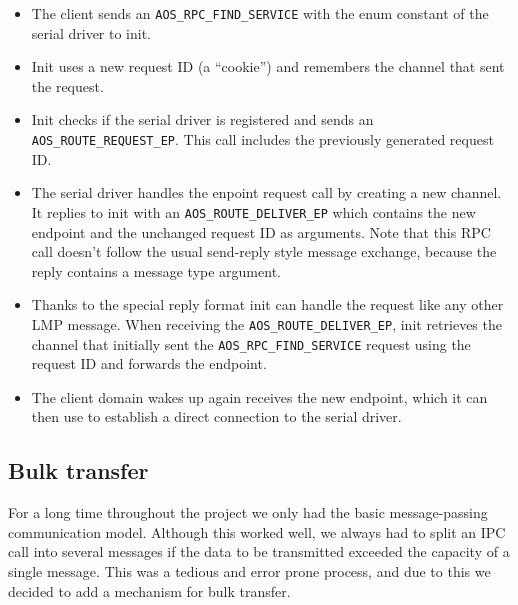 \documentclass[a4paper,10pt]{article}
\begin{document}
\begin{itemize}
 \item The client sends an \lstinline!AOS_RPC_FIND_SERVICE! with the enum constant of the serial driver to init.
 \item Init uses a new request ID (a ``cookie'') and remembers the channel that sent the request.
 \item Init checks if the serial driver is registered and sends an \lstinline!AOS_ROUTE_REQUEST_EP!.
 This call includes the previously generated request ID.
 \item The serial driver handles the enpoint request call by creating a new channel.
 It replies to init with an \lstinline!AOS_ROUTE_DELIVER_EP! which contains the new endpoint and the unchanged request ID as arguments.
 Note that this RPC call doesn't follow the usual send-reply style message exchange, because the reply contains a message type argument.
 \item Thanks to the special reply format init can handle the request like any other LMP message.
 When receiving the \lstinline!AOS_ROUTE_DELIVER_EP!, init retrieves the channel that initially sent the \lstinline!AOS_RPC_FIND_SERVICE! request using the request ID and forwards the endpoint.
 \item The client domain wakes up again receives the new endpoint, which it can then use to establish a direct connection to the serial driver.
\end{itemize}




\subsection{Bulk transfer}

For a long time throughout the project we only had the basic message-passing communication model.
Although this worked well, we always had to split an IPC call into several messages if the data to be transmitted exceeded the capacity of a single message.
This was a tedious and error prone process, and due to this we decided to add a mechanism for bulk transfer.
\end{document}
